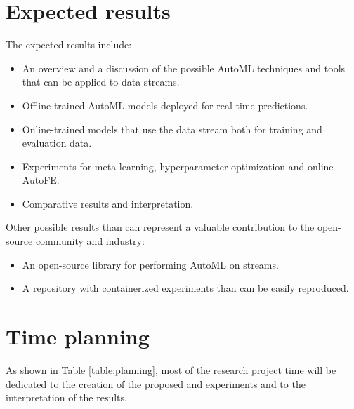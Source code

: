 \documentclass{sig-alternate-br}
\begin{document}
\newpage
\section{Expected results}
The expected results include:
\begin{itemize}
  \item An overview and a discussion of the possible AutoML techniques and tools that can be applied to data streams.
  \item Offline-trained AutoML models deployed for real-time predictions.
  \item Online-trained models that use the data stream both for training and evaluation data.
  \item Experiments for meta-learning, hyperparameter optimization and online AutoFE.
  \item Comparative results and interpretation.
\end{itemize}

Other possible results than can represent a valuable contribution to the open-source community and industry:
\begin{itemize}
  \item An open-source library for performing AutoML on streams.
  \item A repository with containerized experiments than can be easily reproduced.
\end{itemize}

\section{Time planning}
As shown in Table \ref{table:planning}, most of the research project time will be dedicated to the creation of the proposed and experiments and to the interpretation of the results.



  
%
\end{document}
